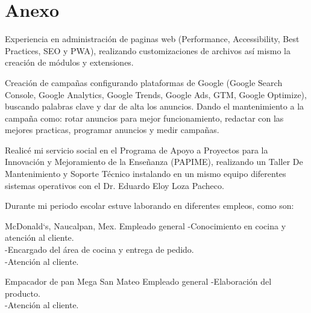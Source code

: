 \documentclass[%
	       doublesided,
	       paper=a4,
	       fontsize=10pt
	      ]{my-resume}
\begin{document}
\section{Anexo}


\vspace{5mm}
Experiencia en administración de paginas web (Performance, Accessibility, Best Practices, SEO y PWA), realizando customizaciones de archivos así mismo la creación de módulos y extensiones.

\vspace{5mm}
Creación de campañas configurando plataformas de Google (Google Search Console, Google Analytics, Google Trends, Google Ads, GTM, Google Optimize),
buscando palabras clave y dar de alta los anuncios. Dando el mantenimiento a la campaña como: rotar anuncios para mejor funcionamiento, redactar con las mejores practicas, programar anuncios y medir campañas.

\vspace{5mm}
Realicé mi servicio social en el Programa de Apoyo a Proyectos para la Innovación y Mejoramiento de la Enseñanza (PAPIME), realizando un Taller De Mantenimiento y Soporte Técnico instalando en un mismo equipo diferentes sistemas operativos con el Dr. Eduardo Eloy Loza Pacheco.

\vspace{5mm}
Durante mi periodo escolar estuve laborando en diferentes empleos, como son:
\vspace{3mm}


{McDonald`s, Naucalpan, Mex.}
{Empleado general}
{
-Conocimiento en cocina y atención al cliente.\\
-Encargado del área de cocina y entrega de pedido.\\
-Atención al cliente.
}

{Empacador de pan Mega San Mateo}
{Empleado general}
{
-Elaboración del producto.\\
-Atención al cliente.
}
\end{document}
